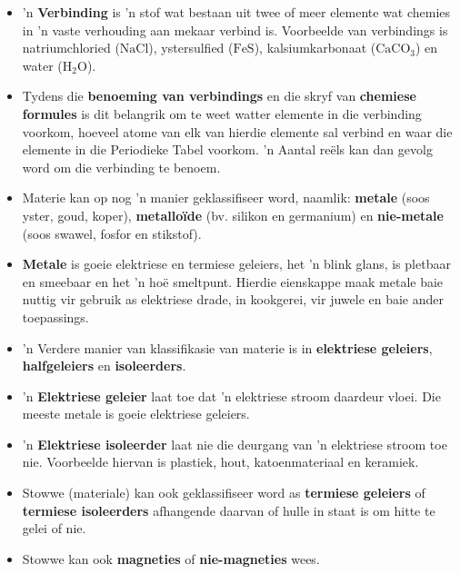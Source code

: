 \begin{itemize}[noitemsep]
     \item 'n \textbf{Verbinding} is 'n stof wat bestaan uit twee of meer elemente wat chemies
in 'n vaste verhouding aan mekaar verbind is. Voorbeelde van verbindings is natriumchloried ($\text{NaCl}$),
ystersulfied ($\text{FeS}$), kalsiumkarbonaat (${\text{CaCO}}_{3}$) en water (${\text{H}}_{2}\text{O}$).
     \item Tydens die \textbf{benoeming van verbindings} en die skryf van \textbf{chemiese formules} is dit belangrik om  te weet watter elemente in die verbinding voorkom, hoeveel atome van elk van hierdie elemente sal verbind en waar die elemente in die Periodieke Tabel voorkom. 'n Aantal re\"els kan dan gevolg word om die verbinding te benoem.
     \item Materie kan op nog 'n manier geklassifiseer word, naamlik: \textbf{metale} (soos yster, goud, koper), \textbf{metallo\"ide} (bv. silikon en germanium) en \textbf{nie-metale} (soos swawel, fosfor en stikstof).
     \item \textbf{Metale} is goeie elektriese en termiese geleiers, het 'n blink glans, is pletbaar en smeebaar en het 'n ho\"e smeltpunt. Hierdie eienskappe maak metale baie nuttig vir gebruik as elektriese drade, in kookgerei, vir juwele en baie ander toepassings.
     \item 'n Verdere manier van klassifikasie van materie is in \textbf{elektriese geleiers}, \textbf{halfgeleiers} en \textbf{isoleerders}.
     \item 'n \textbf{Elektriese geleier} laat toe dat 'n elektriese stroom daardeur vloei. Die meeste metale is goeie elektriese geleiers.
     \item 'n \textbf{Elektriese isoleerder} laat nie die deurgang van 'n elektriese stroom toe nie. Voorbeelde hiervan is plastiek, hout, katoenmateriaal en keramiek.
     \item Stowwe (materiale) kan ook geklassifiseer word as \textbf{termiese geleiers} of \textbf{termiese isoleerders} afhangende daarvan of hulle in staat is om hitte te gelei of nie.
     \item Stowwe kan ook \textbf{magneties} of \textbf{nie-magneties} wees.
\end{itemize} 

\label{m38706*secfhsst!!!underscore!!!id672}

